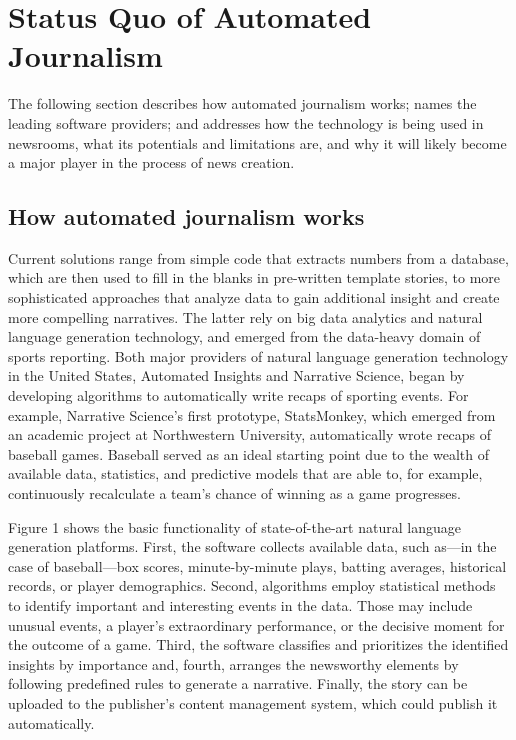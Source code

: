 \documentclass[notoc, symmetric, nobib, nols]{towcenter-book}
\begin{document}
\chapter{Status Quo of Automated Journalism}

The following section describes how automated journalism works; names the leading software providers; and addresses how the technology is being used in newsrooms, what its potentials and limitations are, and why it will likely become a major player in the process of news creation.

\section{How automated journalism works}

Current solutions range from simple code that extracts numbers from a database, which are then used to fill in the blanks in pre-written template stories, to more sophisticated approaches that analyze data to gain additional insight and create more compelling narratives. The latter rely on big data analytics and natural language generation technology, and emerged from the data-heavy domain of sports reporting. Both major providers of natural language generation technology in the United States, Automated Insights and Narrative Science, began by developing algorithms to automatically write recaps of sporting events. For example, Narrative Science’s first prototype, StatsMonkey, which emerged from an academic project at Northwestern University, automatically wrote recaps of baseball games.\cite{levy12} Baseball served as an ideal starting point due to the wealth of available data, statistics, and predictive models that are able to, for example, continuously recalculate a team’s chance of winning as a game progresses. 

Figure 1 shows the basic functionality of state-of-the-art natural language generation platforms.\cite{reiter2000}\cite{doerr15} First, the software collects available data, such as---in the case of baseball---box scores, minute-by-minute plays, batting averages, historical records, or player demographics. Second, algorithms employ statistical methods to identify important and interesting events in the data. Those may include unusual events, a player’s extraordinary performance, or the decisive moment for the outcome of a game. Third, the software classifies and prioritizes the identified insights by importance and, fourth, arranges the newsworthy elements by following predefined rules to generate a narrative. Finally, the story can be uploaded to the publisher’s content management system, which could publish it automatically. 
\end{document}
